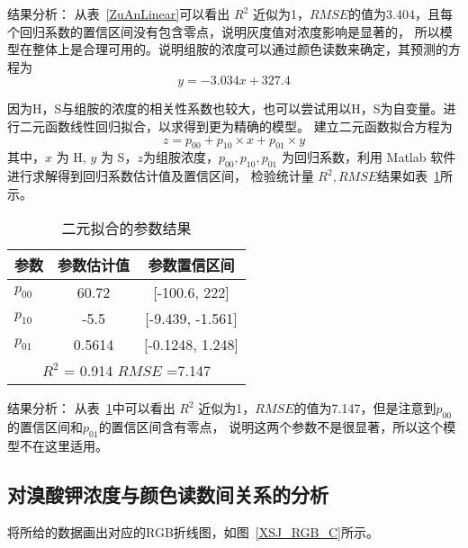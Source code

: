     结果分析： 从表~\ref{ZuAnLinear}可以看出 $R^2$ 近似为1，$RMSE$的值为3.404，且每个回归系数的置信区间没有包含零点，说明灰度值对浓度影响是显著的，
    所以模型在整体上是合理可用的。说明组胺的浓度可以通过颜色读数来确定，其预测的方程为
    $$y = -3.034x + 327.4 $$
    
    因为H，S与组胺的浓度的相关性系数也较大，也可以尝试用以H，S为自变量。进行二元函数线性回归拟合，以求得到更为精确的模型。
    建立二元函数拟合方程为
    $$ z = p_{00} + p_{10} \times x + p_{01} \times y$$
    其中，$x$ 为 H, $y$ 为 S，$z$为组胺浓度，$p_{00},p_{10},p_{01}$ 为回归系数，利用 Matlab 软件进行求解得到回归系数估计值及置信区间，
    检验统计量 $R^2, RMSE $结果如表~\ref{ZuAn2Dim}所示。

    \begin{table}[H]
        \centering
        \caption{二元拟合的参数结果}
        \label{ZuAn2Dim}
        \begin{tabular}{@{}lcc@{}}
        \toprule
        参数       & 参数估计值  & 参数置信区间                       \\ \midrule
        $p_{00}$ & 60.72  & {[}-100.6, 222{]}    \\
        $p_{10}$ & -5.5   & {[}-9.439, -1.561{]} \\
        $p_{01}$ & 0.5614 & {[}-0.1248, 1.248{]} \\
        \hline
        \multicolumn{3}{c}{$R^2$ = 0.914 $RMSE$ =7.147}  \\ \bottomrule
        \end{tabular}
        \end{table}

    结果分析： 从表~\ref{ZuAn2Dim}中可以看出 $R^2$ 近似为1，$RMSE$的值为7.147，但是注意到$p_{00}$的置信区间和$p_{01}$的置信区间含有零点，
    说明这两个参数不是很显著，所以这个模型不在这里适用。

\subsection{对溴酸钾浓度与颜色读数间关系的分析}

    将所给的数据画出对应的RGB折线图，如图~\ref{XSJ_RGB_C}所示。


